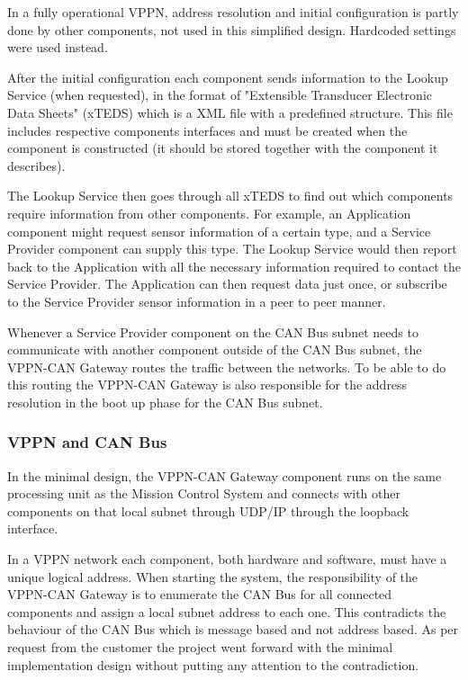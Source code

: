 In a fully operational VPPN, address resolution and initial
configuration is partly done by other components, not used in this simplified design. Hardcoded settings were used instead.

After the initial configuration each component sends information to the Lookup Service (when requested), in the format of "Extensible Transducer Electronic Data Sheets" (xTEDS) which is a XML file with a predefined structure. This file includes respective components interfaces and must be created when the component is constructed (it should be stored together with the component it describes).

The Lookup Service then goes through all xTEDS to find out which components require information from other components. For example, an Application component might request sensor information of a certain type, and a Service Provider component can supply this type. The Lookup Service would then report back to the Application with all the necessary information required to contact the Service Provider. The Application can then request data just once, or subscribe to the Service Provider sensor information in a peer to peer manner.

Whenever a Service Provider component on the CAN Bus subnet needs to communicate
with another component outside of the CAN Bus subnet, the VPPN-CAN Gateway routes the traffic between the networks. To be able to do this routing the VPPN-CAN Gateway is also responsible for the address resolution in the boot up phase for the CAN Bus subnet.

\subsubsection{VPPN and CAN Bus}\label{subsubsec:vppn_can_bus}
In the minimal design, the VPPN-CAN Gateway component runs on the same
processing unit as the Mission Control System and connects with other
components on that local subnet through UDP/IP through the loopback interface.

In a VPPN network each component, both hardware and software, must have a unique
logical address. When starting the system, the responsibility of the VPPN-CAN Gateway is to
enumerate the CAN Bus for all connected components and assign a local subnet address to
each one. This contradicts the behaviour of the CAN Bus which is message based
and not address based. As per request from the customer the project went
forward with the minimal implementation design without putting any attention to
the contradiction.

